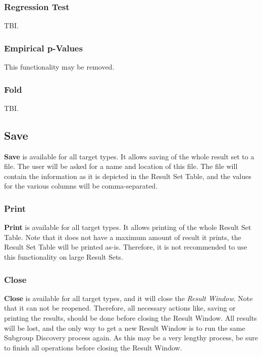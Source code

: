 \documentclass{article}
\begin{document}
\subsubsection{Regression Test}
\label{result-window:regression}
TBI.



\subsubsection{Empirical p-Values}
\label{result-window:empirical-p}
This functionality may be removed.



\subsubsection{Fold}
\label{result-window:fold}
TBI.



\subsection{Save}
\label{result-window:save}
\textbf{Save} is available for all target types.
It allows saving of the whole result set to a file.
The user will be asked for a name and location of this file.
The file will contain the information as it is depicted in the Result Set Table, and the values for the various columns will be comma-separated.



\subsubsection{Print}
\label{result-window:print}
\textbf{Print} is available for all target types.
It allows printing of the whole Result Set Table.
Note that it does not have a maximum amount of result it prints, the Result Set Table will be printed as-is.
Therefore, it is not recommended to use this functionality on large Result Sets.



\subsubsection{Close}
\label{result-window:close}
\textbf{Close} is available for all target types, and it will close the \emph{Result Window}.
Note that it can not be reopened.
Therefore, all necessary actions like, saving or printing the results, should be done before closing the Result Window.
All results will be lost, and the only way to get a new Result Window is to run the same Subgroup Discovery process again.
As this may be a very lengthy process, be sure to finish all operations before closing the Result Window.
\end{document}

